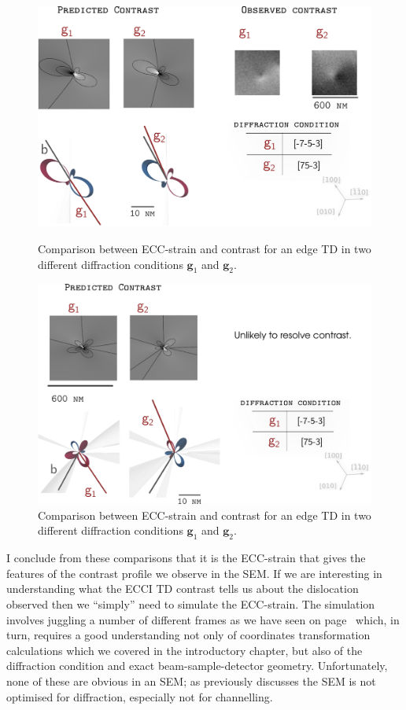 \begin{figure}[ht]
    \centering
    \includegraphics[width=0.7\linewidth]{Figures/edgecompare.png}
    \caption{ Comparison between ECC-strain and contrast for an edge TD in two different diffraction conditions $\textbf{g}_1$ and $\textbf{g}_2$.}
    \label{fig:edgecompare}

 \vspace*{\floatsep}

    \includegraphics[width=0.7\linewidth]{Figures/edgecompare0.png}
    \caption{ Comparison between ECC-strain and contrast for an edge TD in two different diffraction conditions $\textbf{g}_1$ and $\textbf{g}_2$.}
    \label{fig:edgecompare0}
\end{figure}


I conclude from these comparisons that it is the ECC-strain that gives the features of the contrast profile we observe in the SEM. If we are interesting in understanding what the ECCI TD contrast tells us about the dislocation observed then we ``simply'' need to simulate the ECC-strain. The simulation involves juggling a number of different frames as we have seen on page~\pageref{sec:coordinates} which, in turn, requires a good understanding not only of coordinates transformation calculations which we covered in the introductory chapter, but also of the diffraction condition and exact beam-sample-detector geometry. Unfortunately, none of these are obvious in an SEM; as previously discusses the SEM is not optimised for diffraction, especially not for channelling.






